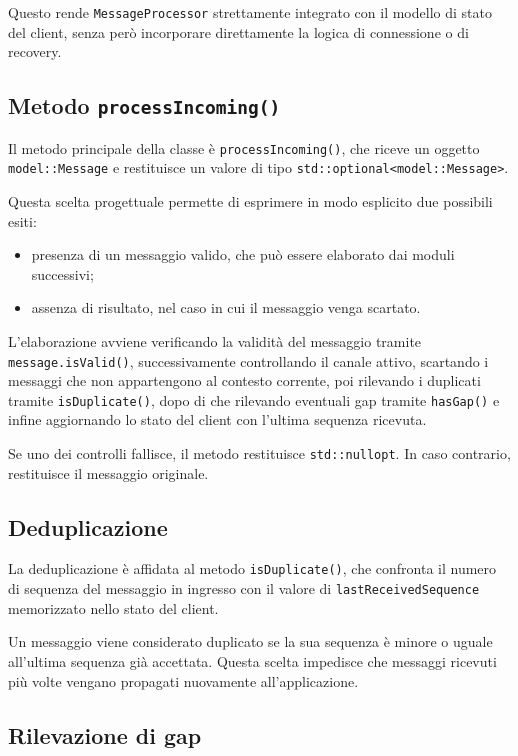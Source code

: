 \documentclass[a4paper, 11pt, twoside]{report}
\begin{document}
Questo rende \texttt{MessageProcessor} strettamente integrato con il modello di stato del client, senza però incorporare direttamente
la logica di connessione o di recovery.

\subsection{Metodo \texttt{processIncoming()}}

Il metodo principale della classe è \texttt{processIncoming()}, che riceve un oggetto \texttt{model::Message} e restituisce un valore di
tipo \texttt{std::optional<model::Message>}.

Questa scelta progettuale permette di esprimere in modo esplicito due possibili esiti:
\begin{itemize}
    \item presenza di un messaggio valido, che può essere elaborato dai moduli successivi;
    \item assenza di risultato, nel caso in cui il messaggio venga scartato.
\end{itemize}

L'elaborazione avviene verificando la validità del messaggio tramite \texttt{message.isValid()}, successivamente controllando il canale
attivo, scartando i messaggi che non appartengono al contesto corrente, poi rilevando i duplicati tramite \texttt{isDuplicate()}, dopo di
che rilevando eventuali gap tramite \texttt{hasGap()} e infine aggiornando lo stato del client con l'ultima sequenza ricevuta.

Se uno dei controlli fallisce, il metodo restituisce \texttt{std::nullopt}. In caso contrario, restituisce il messaggio originale.

\subsection{Deduplicazione}

La deduplicazione è affidata al metodo \texttt{isDuplicate()}, che confronta il numero di sequenza del messaggio in ingresso con il valore di
\texttt{lastReceivedSequence} memorizzato nello stato del client.

Un messaggio viene considerato duplicato se la sua sequenza è minore o uguale all'ultima sequenza già accettata. Questa scelta impedisce che 
messaggi ricevuti più volte vengano propagati nuovamente all'applicazione.

\subsection{Rilevazione di gap}
\end{document}
